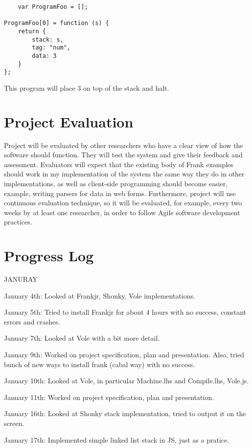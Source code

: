 \documentclass[12pt]{report}
\begin{document}
\begin{lstlisting}
    var ProgramFoo = [];

ProgramFoo[0] = function (s) {
    return {
        stack: s,
        tag: "num",
        data: 3
    }
};

\end{lstlisting}

This program will place 3 on top of the stack and halt.




\section{Project Evaluation}

Project will be evaluated by other researchers who have a clear view of how the
software should function. They will test the system and give their feedback and
assessment. Evaluators will expect that the existing body of Frank examples should
work in my implementation of the system the same way they do in other
implementations, as well as client-side programming should become easier, example,
writing parsers for data in web forms. Furthermore, project will use continuous
evaluation technique, so it will be evaluated, for example, every two weeks by at
least one researcher, in order to follow Agile software development practices.  

\section{Progress Log}

JANURAY

January 4th: Looked at Frankjr, Shonky, Vole implementations.

January 5th: Tried to install Frankjr for about 4 hours with no success, constant
errors and crashes.

January 7th: Looked at Vole with a bit more detail.

January 9th: Worked on project specification, plan and presentation. Also, tried
bunch of new ways to install frank (cabal way) with no success.

January 10th: Looked at Vole, in particular Machine.lhs and Compile.lhs, Vole.js.

January 11th: Worked on project specification, plan and presentation.

January 16th: Looked at Shonky stack implementation, tried to output it
on the screen.

January 17th: Implemented simple linked list stack in JS, just as a pratice.
\end{document}
